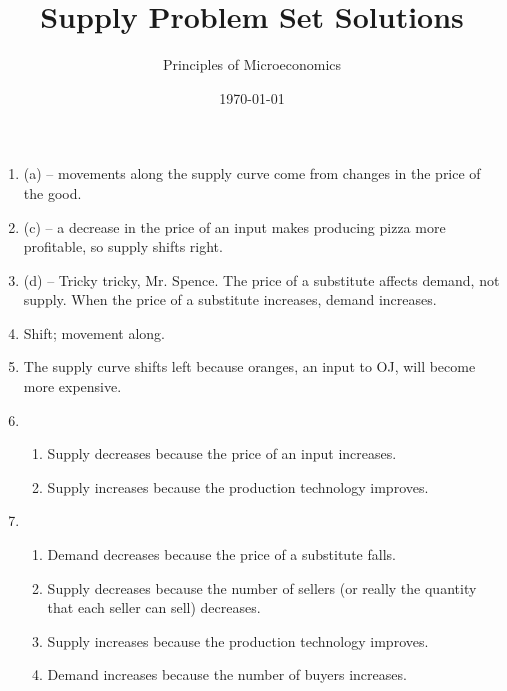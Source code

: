 \documentclass{article}
\title{Supply Problem Set Solutions}
\author{Principles of Microeconomics}
\date{\today}
\begin{document}
\maketitle

\begin{enumerate}

\item (a) -- movements along the supply curve come from changes in the price of the good.

\item (c) -- a decrease in the price of an input makes producing pizza more profitable, so supply shifts right.

\item (d) -- Tricky tricky, Mr. Spence. The price of a substitute affects demand, not supply. When the price of a substitute increases, demand increases.

\item Shift; movement along.

\item The supply curve shifts left because oranges, an input to OJ, will become more expensive. 

\item

	\begin{enumerate}
	
	\item Supply decreases because the price of an input increases.
	
	\item Supply increases because the production technology improves. 
	
	\end{enumerate}
	
\item

	\begin{enumerate}
	
	\item Demand decreases because the price of a substitute falls.
	
	\item Supply decreases because the number of sellers (or really the quantity that each seller can sell) decreases. 
	
	\item Supply increases because the production technology improves. 
	
	\item Demand increases because the number of buyers increases.
	
	\end{enumerate}

\end{enumerate}
\end{document}
